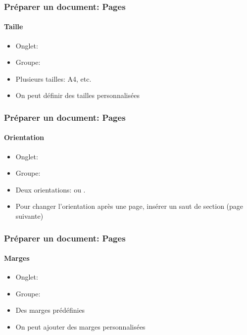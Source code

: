 \documentclass[xcolor=table]{beamer}
\begin{document}
\begin{frame}[t]
\frametitle{Préparer un document: Pages}
\framesubtitle{Taille}

\begin{minipage}{0.44\textwidth}
	\begin{itemize}
		\item Onglet: 
		\item Groupe: 
		\item Plusieurs tailles: A4, etc.
		\item On peut définir des tailles personnalisées
	\end{itemize}
\end{minipage}
\begin{minipage}{0.55\textwidth}
\end{minipage}

\end{frame}


\begin{frame}[t]
\frametitle{Préparer un document: Pages}
\framesubtitle{Orientation}

\begin{minipage}{0.44\textwidth}
	\begin{itemize}
		\item Onglet: 
		\item Groupe: 
		\item Deux orientations:  ou .
		\item Pour changer l'orientation après une page, insérer un saut de section (page suivante)
	\end{itemize}
\end{minipage}
\begin{minipage}{0.55\textwidth}
	\vspace{1cm}%
\end{minipage}

\end{frame}

\begin{frame}[t]
\frametitle{Préparer un document: Pages}
\framesubtitle{Marges}

\begin{minipage}{0.44\textwidth}
	\begin{itemize}
		\item Onglet: 
		\item Groupe: 
		\item Des marges prédéfinies
		\item On peut ajouter des marges personnalisées
	\end{itemize}
\end{minipage}
\begin{minipage}{0.55\textwidth}
\end{minipage}

\end{frame}
\end{document}
